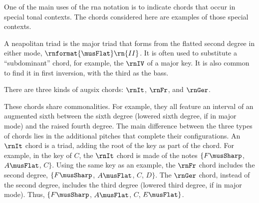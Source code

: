 
One of the main uses of the \gls{rna} notation is to
indicate chords that occur in special tonal contexts. The
chords considered here are examples of those special
contexts.


A \gls{neapolitan} triad is the major triad that forms from
the flatted second degree in either mode,
$\rnformat{\musFlat}\rn{II}$. It is often used to substitute
a ``subdominant'' chord, for example, the $\rnIV$ of a major
key. It is also common to find it in first inversion, with
the third as the bass.


There are three kinds of \gls{augsix} chords: $\rnIt$,
$\rnFr$, and $\rnGer$.

These chords share commonalities. For example, they all
feature an interval of an augmented sixth between the sixth
degree (lowered sixth degree, if in major mode) and the
raised fourth degree. The main difference between the three
types of chords lies in the additional pitches that complete
their configurations. An $\rnIt$ chord is a triad, adding
the root of the key as part of the chord. For example, in
the key of $C$, the $\rnIt$ chord is made of the notes
$\{F\musSharp$, $A\musFlat$, $C\}$. Using the same key as an
example, the $\rnFr$ chord includes the second degree,
$\{F\musSharp$, $A\musFlat$, $C$, $D\}$. The $\rnGer$ chord,
instead of the second degree, includes the third degree
(lowered third degree, if in major mode). Thus,
$\{F\musSharp$, $A\musFlat$, $C$, $E\musFlat\}$.
